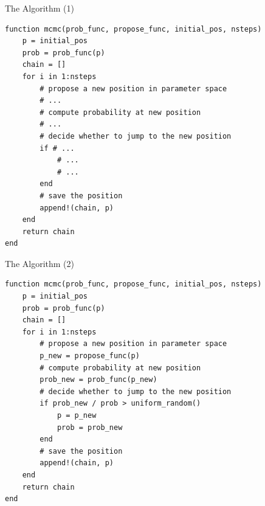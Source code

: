 \documentclass{beamer}
\begin{document}
% 


\begin{frame}[fragile]{The Algorithm (1)}
\begin{footnotesize}
\begin{verbatim}
function mcmc(prob_func, propose_func, initial_pos, nsteps)
    p = initial_pos
    prob = prob_func(p)
    chain = []
    for i in 1:nsteps
        # propose a new position in parameter space
        # ...
        # compute probability at new position
        # ...
        # decide whether to jump to the new position
        if # ...
            # ...
            # ...
        end
        # save the position
        append!(chain, p)
    end
    return chain
end
\end{verbatim}
\end{footnotesize}
\end{frame}

\begin{frame}[fragile]{The Algorithm (2)}
\begin{footnotesize}
\begin{verbatim}
function mcmc(prob_func, propose_func, initial_pos, nsteps)
    p = initial_pos
    prob = prob_func(p)
    chain = []
    for i in 1:nsteps
        # propose a new position in parameter space
        p_new = propose_func(p)
        # compute probability at new position
        prob_new = prob_func(p_new)
        # decide whether to jump to the new position
        if prob_new / prob > uniform_random()
            p = p_new
            prob = prob_new
        end
        # save the position
        append!(chain, p)
    end
    return chain
end
\end{verbatim}
\end{footnotesize}
\end{frame}
\end{document}
